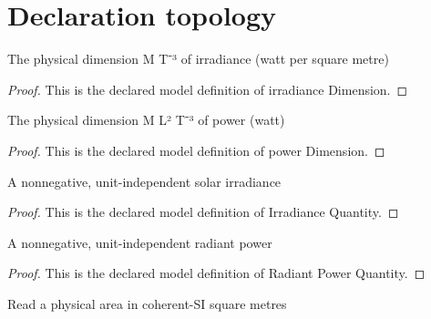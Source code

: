 \section{Declaration topology}
\begin{definition}
  \label{def:physics:phyx-mini-0945:phyxminiproblems-problemphyxmini0945-irradiancedimension}
  The physical dimension M T⁻³ of irradiance (watt per square metre)
\end{definition}
\begin{proof}
  This is the declared model definition of irradiance Dimension.
\end{proof}
\begin{definition}
  \label{def:physics:phyx-mini-0945:phyxminiproblems-problemphyxmini0945-powerdimension}
  The physical dimension M L² T⁻³ of power (watt)
\end{definition}
\begin{proof}
  This is the declared model definition of power Dimension.
\end{proof}
\begin{definition}
  \label{def:physics:phyx-mini-0945:phyxminiproblems-problemphyxmini0945-irradiancequantity}
  A nonnegative, unit-independent solar irradiance
\end{definition}
\begin{proof}
  This is the declared model definition of Irradiance Quantity.
\end{proof}
\begin{definition}
  \label{def:physics:phyx-mini-0945:phyxminiproblems-problemphyxmini0945-radiantpowerquantity}
  A nonnegative, unit-independent radiant power
\end{definition}
\begin{proof}
  This is the declared model definition of Radiant Power Quantity.
\end{proof}
\begin{definition}
  \label{def:physics:phyx-mini-0945:phyxminiproblems-problemphyxmini0945-areainsquaremeters}
  Read a physical area in coherent-SI square metres
\end{definition}
